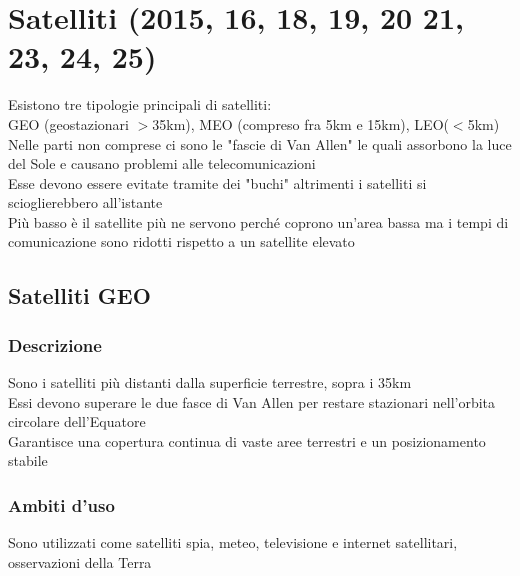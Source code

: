 \documentclass[10pt,oneside,a4paper]{article}
\begin{document}
\section{Satelliti (2015, 16, 18, 19, 20 21, 23, 24, 25)}
Esistono tre tipologie principali di satelliti: \\
GEO (geostazionari $>$35km), MEO (compreso fra 5km e 15km), LEO($<$5km)\\
Nelle parti non comprese ci sono le "fascie di Van Allen" le quali assorbono la luce del Sole e causano problemi alle telecomunicazioni\\
Esse devono essere evitate tramite dei "buchi" altrimenti i satelliti si scioglierebbero all'istante\\
Più basso è il satellite più ne servono perché coprono un'area bassa ma i tempi di comunicazione sono ridotti rispetto a  un satellite elevato
\subsection{Satelliti GEO}
\subsubsection{Descrizione}
Sono i satelliti più distanti dalla superficie terrestre, sopra i 35km\\
Essi devono superare le due fasce di Van Allen per restare stazionari nell'orbita circolare dell'Equatore\\
Garantisce una copertura continua di vaste aree terrestri e un posizionamento stabile
\subsubsection{Ambiti d'uso}
Sono utilizzati come satelliti spia, meteo, televisione e internet satellitari, osservazioni della Terra
\end{document}
